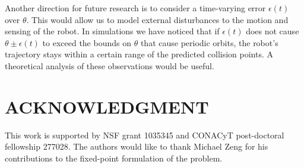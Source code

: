 \documentclass[letterpaper, 10 pt, conference]{ieeeconf}  %
\begin{document}
Another direction for future research is to consider a 
time-varying error $\epsilon(t)$ over $\theta$. This would
allow us to model external disturbances to the 
motion and sensing of the robot. In
simulations we have noticed that if $\epsilon(t)$ does not cause $\theta \pm
\epsilon(t)$ to exceed the bounds on $\theta$ that cause periodic orbits, the robot's 
trajectory stays within a certain range of the predicted collision points. 
A theoretical analysis of these observations would be useful. 

\addtolength{\textheight}{-12cm}   %








\section*{ACKNOWLEDGMENT}

This work is supported by NSF grant 1035345 and CONACyT post-doctoral
fellowship 277028. The authors would like to thank Michael Zeng for his
contributions to the fixed-point formulation of the problem.




\end{document}
